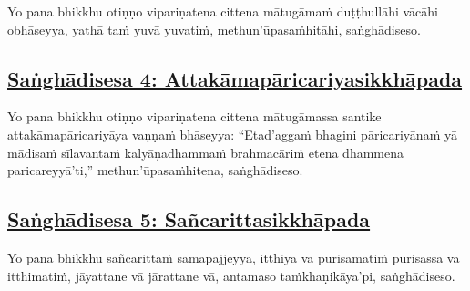 Yo pana bhikkhu otiṇṇo vipariṇatena cittena mātugāmaṁ duṭṭhullāhi vācāhi obhāseyya, yathā taṁ\makeatletter\hyperlink{endnote41-appendix}\makeatother{} yuvā yuvatiṁ, methun'ūpasaṁhitāhi,\makeatletter\hyperlink{endnote42-appendix}\makeatother{} saṅghādiseso.



\subsection*{\hyperref[comm4]{Saṅghādisesa 4: Attakāmapāricariyasikkhāpada}}
\label{sd4}

Yo pana bhikkhu otiṇṇo vipariṇatena cittena mātugāmassa santike attakāmapāricariyāya vaṇṇaṁ bhāseyya: ``Etad'aggaṁ bhagini pāricariyānaṁ yā mādisaṁ sīlavantaṁ kalyāṇadhammaṁ brahmacāriṁ etena dhammena paricareyyā'ti,''\makeatletter\hyperlink{endnote43-appendix}\makeatother{} methun'ūpasaṁhitena,\makeatletter\hyperlink{endnote44-appendix}\makeatother{} saṅghādiseso.



\subsection*{\hyperref[comm5]{Saṅghādisesa 5: Sañcarittasikkhāpada}}
\label{sd5}

Yo pana bhikkhu sañcarittaṁ samāpajjeyya, itthiyā vā purisamatiṁ purisassa vā itthimatiṁ,\makeatletter\hyperlink{endnote45-appendix}\makeatother{} jāyattane vā jārattane vā, antamaso taṁkhaṇikāya'pi,\makeatletter\hyperlink{endnote46-appendix}\makeatother{} saṅghādiseso.



